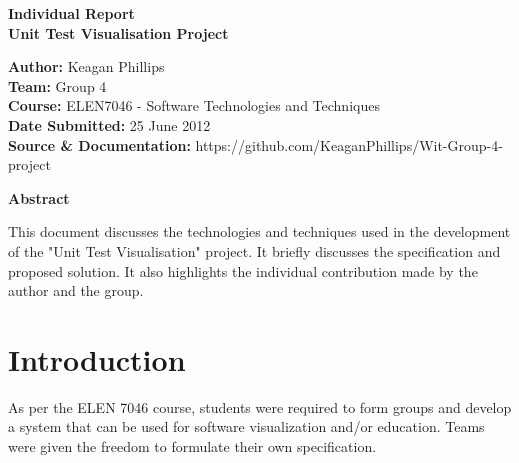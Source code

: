 \documentclass[a4paper,12pt]{article}
\begin{document}
\begin{center}
\begin{Huge}
\textbf{{\LARGE Individual Report \\ Unit Test Visualisation Project }}
\linebreak
\linebreak
\linebreak
\linebreak
\end{Huge}\end{center}




\begin{small}
\begin{flushleft}
\textbf{Author:} Keagan Phillips
\\
\textbf{Team:} Group 4
\\
\textbf{Course:} ELEN7046 - Software Technologies and Techniques
\\
\textbf{Date Submitted:} 25 June 2012
\\
\textbf{Source \& Documentation:} https://github.com/KeaganPhillips/Wit-Group-4-project
\linebreak
\linebreak
\linebreak
\linebreak
\linebreak
\end{flushleft}

\end{small}


\begin{flushleft}
\textbf{{\large Abstract}}
\end{flushleft}
This document discusses the technologies and techniques used in the development of the "Unit Test Visualisation" project. It briefly discusses the specification and proposed solution. It also highlights the individual contribution  made by the author and the group.    
\clearpage


\tableofcontents


\clearpage

\section{Introduction}
As per the ELEN 7046 course, students were required to form groups and develop a system that can be used for software visualization and/or education. Teams were given the freedom to formulate their own specification.
\end{document}
